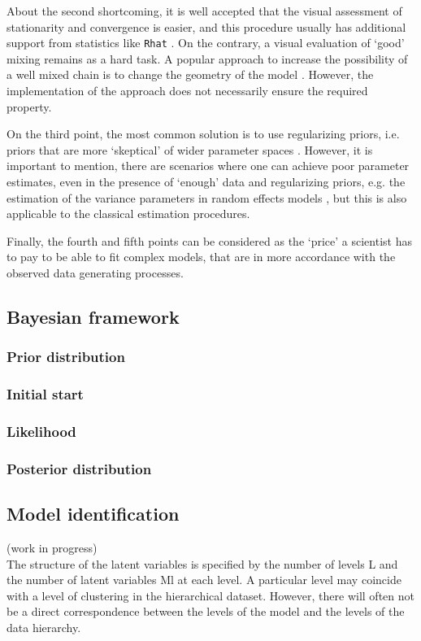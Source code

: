 About the second shortcoming, it is well accepted that the visual assessment of stationarity and convergence is easier, and this procedure usually has additional support from statistics like \texttt{Rhat} \cite{Gelman_et_al_2014}. On the contrary, a visual evaluation of `good' mixing remains as a hard task. A popular approach to increase the possibility of a well mixed chain is to change the geometry of the model \cite{McElreath_2020}. However, the implementation of the approach does not necessarily ensure the required property.

On the third point, the most common solution is to use regularizing priors, i.e. priors that are more `skeptical' of wider parameter spaces \cite{McElreath_2020}. However, it is important to mention, there are scenarios where one can achieve poor parameter estimates, even in the presence of `enough' data and regularizing priors, e.g. the estimation of the variance parameters in random effects models \cite{Skrondal_et_al_2004a}, but this is also applicable to the classical estimation procedures.

Finally, the fourth and fifth points can be considered as the `price' a scientist has to pay to be able to fit complex models, that are in more accordance with the observed data generating processes.


\subsection{Bayesian framework}

\subsubsection{Prior distribution}

\subsubsection{Initial start}

\subsubsection{Likelihood}

\subsubsection{Posterior distribution}


\subsection{Model identification} \label{sect:identification}
{\color{red}(work in progress) \\
	
	The structure of the latent variables is specified by the number of levels L and the number of latent variables Ml at each level. A particular level may coincide with a level of clustering in the hierarchical dataset. However, there will often not be a direct correspondence between the levels of the model and the levels of the data hierarchy.
	
}


